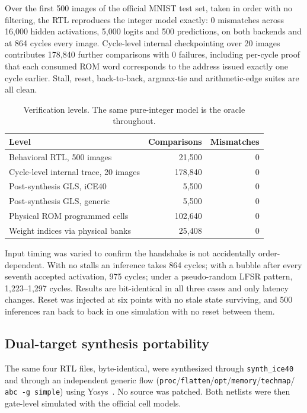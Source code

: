 \documentclass[conference]{IEEEtran}
\begin{document}
Over the first 500 images of the official MNIST test set, taken in order with
no filtering, the RTL reproduces the integer model exactly: 0 mismatches across
16{,}000 hidden activations, 5{,}000 logits and 500 predictions, on both
backends and at 864 cycles every image. Cycle-level internal checkpointing over
20 images contributes 178{,}840 further comparisons with 0 failures, including
per-cycle proof that each consumed ROM word corresponds to the address issued
exactly one cycle earlier. Stall, reset, back-to-back, argmax-tie and
arithmetic-edge suites are all clean.

\begin{table}[t]
\centering
\caption{Verification levels. The same pure-integer model is the oracle
throughout.}
\label{tab:verif}
\footnotesize
\begin{tabular}{@{}lrr@{}}
\toprule
Level & Comparisons & Mismatches \\
\midrule
Behavioral RTL, 500 images & 21{,}500 & 0 \\
Cycle-level internal trace, 20 images & 178{,}840 & 0 \\
Post-synthesis GLS, iCE40 & 5{,}500 & 0 \\
Post-synthesis GLS, generic & 5{,}500 & 0 \\
Physical ROM programmed cells & 102{,}640 & 0 \\
Weight indices via physical banks & 25{,}408 & 0 \\
\bottomrule
\end{tabular}
\end{table}

Input timing was varied to confirm the handshake is not accidentally
order-dependent. With no stalls an inference takes 864 cycles; with a bubble
after every seventh accepted activation, 975 cycles; under a pseudo-random LFSR
pattern, 1{,}223--1{,}297 cycles. Results are bit-identical in all three cases
and only latency changes. Reset was injected at six points with no stale state
surviving, and 500 inferences ran back to back in one simulation with no reset
between them.

\subsection{Dual-target synthesis portability}

The same four RTL files, byte-identical, were synthesized through
\texttt{synth\_ice40} and through an independent generic flow
(\texttt{proc}/\texttt{flatten}/\texttt{opt}/\texttt{memory}/\texttt{techmap}/
\texttt{abc -g simple}) using Yosys~\cite{yosys}. No source was patched. Both
netlists were then gate-level simulated with the official cell models.
\end{document}
